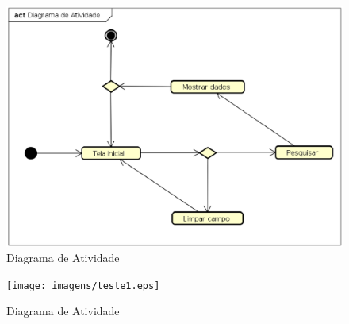 \begin{figure}[!htb]
        \caption{\label{diagrama1}Diagrama de Atividade}
        \begin{center}
                \includegraphics[width=\textwidth]{imagens/teste.eps}
        \end{center}
\end{figure}


\begin{figure}[!htb]
        \caption{\label{diagrama1}Diagrama de Atividade}
        \begin{center}
                \texttt{[image: imagens/teste1.eps]}
        \end{center}
\end{figure}
